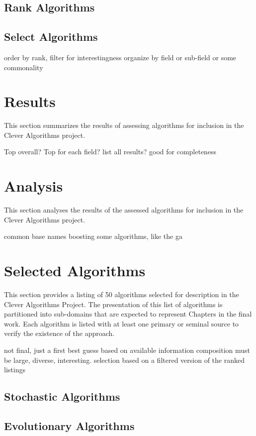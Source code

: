 \documentclass[a4paper, 11pt]{article}
\begin{document}
\subsection{Rank Algorithms}


\subsection{Select Algorithms}
order by rank, filter for interestingness
organize by field or sub-field or some commonality


\section{Results}
\label{sec:results}
This section summarizes the results of assessing algorithms for inclusion in the Clever Algorithms project.

Top overall?
Top for each field?
list all results? good for completeness 

\section{Analysis}
\label{sec:analysis}
This section analyses the results of the assessed algorithms for inclusion in the Clever Algorithms project.

common base names boosting some algorithms, like the ga


\section{Selected Algorithms}
\label{sec:selection}
This section provides a listing of 50 algorithms selected for description in the Clever Algorithms Project. The presentation of this list of algorithms is partitioned into sub-domains that are expected to represent Chapters in the final work. Each algorithm is listed with at least one primary or seminal source to verify the existence of the approach.

not final, just a first best guess based on available information
composition must be large, diverse, interesting. 
selection based on a filtered version of the ranked listings

\subsection{Stochastic Algorithms}

\subsection{Evolutionary Algorithms}
\end{document}
